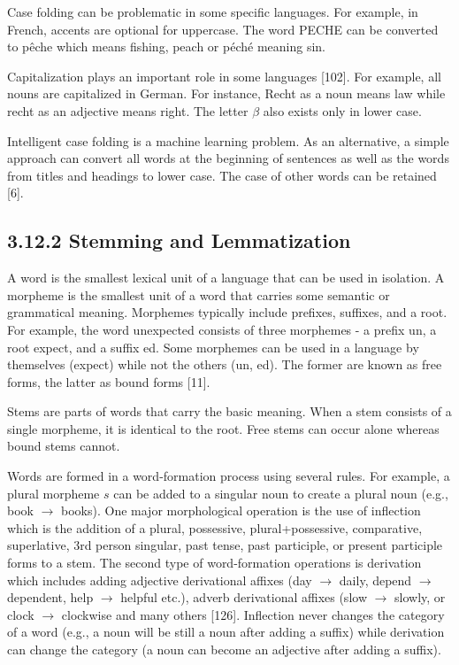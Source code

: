 \documentclass[10pt]{book}
\begin{document}
Case folding can be problematic in some specific languages. For example, in French, accents are optional for uppercase. The word PECHE can be converted to pêche which means fishing, peach or péché meaning sin.

Capitalization plays an important role in some languages [102]. For example, all nouns are capitalized in German. For instance, Recht as a noun means law while recht as an adjective means right. The letter $\beta$ also exists only in lower case.

Intelligent case folding is a machine learning problem. As an alternative, a simple approach can convert all words at the beginning of sentences as well as the words from titles and headings to lower case. The case of other words can be retained [6].

\subsection*{3.12.2 Stemming and Lemmatization}
A word is the smallest lexical unit of a language that can be used in isolation. A morpheme is the smallest unit of a word that carries some semantic or grammatical meaning. Morphemes typically include prefixes, suffixes, and a root. For example, the word unexpected consists of three morphemes - a prefix un, a root expect, and a suffix ed. Some morphemes can be used in a language by themselves (expect) while not the others (un, ed). The former are known as free forms, the latter as bound forms [11].

Stems are parts of words that carry the basic meaning. When a stem consists of a single morpheme, it is identical to the root. Free stems can occur alone whereas bound stems cannot.

Words are formed in a word-formation process using several rules. For example, a plural morpheme $s$ can be added to a singular noun to create a plural noun (e.g., book $\rightarrow$ books). One major morphological operation is the use of inflection which is the addition of a plural, possessive, plural+possessive, comparative, superlative, 3rd person singular, past tense, past participle, or present participle forms to a stem. The second type of word-formation operations is derivation which includes adding adjective derivational affixes (day $\rightarrow$ daily, depend $\rightarrow$ dependent, help $\rightarrow$ helpful etc.), adverb derivational affixes (slow $\rightarrow$ slowly, or clock $\rightarrow$ clockwise and many others [126]. Inflection never changes the category of a word (e.g., a noun will be still a noun after adding a suffix) while derivation can change the category (a noun can become an adjective after adding a suffix).
\end{document}
